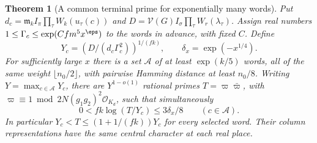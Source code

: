 \documentclass[a4paper,11pt]{article}
\newtheorem{theorem}[proposition]{Theorem}
\theoremstyle{definition}
\theoremstyle{remark}
\numberwithin{equation}{section}
\begin{document}
\begin{theorem}[A common terminal prime for exponentially many words]
\label{thm:common111}
Put \(d_c=\mathfrak m_k I_\pi\prod_\tau W_k(u_\tau(c))\) and
\(D=\mathcal V(G)I_\sigma\prod_\tau W_r(\lambda_\tau)\).
Assign real numbers \(1\le\Gamma_c\le\exp(C f m^5 x^\eps)\)
to the words in advance, with fixed \(C\). Define
\[
     Y_c=\left(D/(d_c\Gamma_c^2)\right)^{1/(fk)},\qquad
     \delta_x=\exp(-x^{1/4}).
\]
For sufficiently large \(x\) there is a set \(\mathcal A\)
of at least \(\exp(k/5)\) words, all of the same weight
\(\lfloor n_0/2\rfloor\), with pairwise Hamming distance
at least \(n_0/8\). Writing \(Y=\max_{c\in\mathcal A}Y_c\), there
are \(Y^{1-o(1)}\) rational primes \(T=\varpi\bar\varpi\), with
\(\varpi\equiv1\bmod 2N(g_1g_2)^2\mathcal O_{K_d}\), such that
simultaneously
\[
            0<fk\log(T/Y_c)\le 3\delta_x/8
                         \qquad(c\in\mathcal A).
\]
In particular \(Y_c<T\le(1+1/(fk))Y_c\) for every selected
word. Their column representations have the same central
character at each real place.
\end{theorem}
\end{document}
